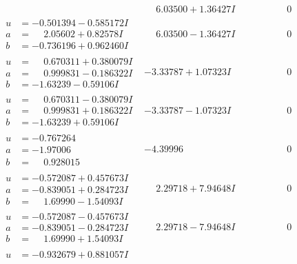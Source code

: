 \documentclass[1p]{elsarticle_modified}
\theoremstyle{definition}
\begin{document}
$$\begin{array}{c|c|c}
 & \phantom{-}6.03500 + 1.36427 I & \phantom{-0.000000 } 0 \\ \hline\begin{aligned}
u &= -0.501394 - 0.585172 I \\
a &= \phantom{-}2.05602 + 0.82578 I \\
b &= -0.736196 + 0.962460 I\end{aligned}
 & \phantom{-}6.03500 - 1.36427 I & \phantom{-0.000000 } 0 \\ \hline\begin{aligned}
u &= \phantom{-}0.670311 + 0.380079 I \\
a &= \phantom{-}0.999831 - 0.186322 I \\
b &= -1.63239 - 0.59106 I\end{aligned}
 & -3.33787 + 1.07323 I & \phantom{-0.000000 } 0 \\ \hline\begin{aligned}
u &= \phantom{-}0.670311 - 0.380079 I \\
a &= \phantom{-}0.999831 + 0.186322 I \\
b &= -1.63239 + 0.59106 I\end{aligned}
 & -3.33787 - 1.07323 I & \phantom{-0.000000 } 0 \\ \hline\begin{aligned}
u &= -0.767264\phantom{ +0.000000I} \\
a &= -1.97006\phantom{ +0.000000I} \\
b &= \phantom{-}0.928015\phantom{ +0.000000I}\end{aligned}
 & -4.39996\phantom{ +0.000000I} & \phantom{-0.000000 } 0 \\ \hline\begin{aligned}
u &= -0.572087 + 0.457673 I \\
a &= -0.839051 + 0.284723 I \\
b &= \phantom{-}1.69990 - 1.54093 I\end{aligned}
 & \phantom{-}2.29718 + 7.94648 I & \phantom{-0.000000 } 0 \\ \hline\begin{aligned}
u &= -0.572087 - 0.457673 I \\
a &= -0.839051 - 0.284723 I \\
b &= \phantom{-}1.69990 + 1.54093 I\end{aligned}
 & \phantom{-}2.29718 - 7.94648 I & \phantom{-0.000000 } 0 \\ \hline\begin{aligned}
u &= -0.932679 + 0.881057 I \\

\end{aligned}
\end{array}$$
\end{document}
